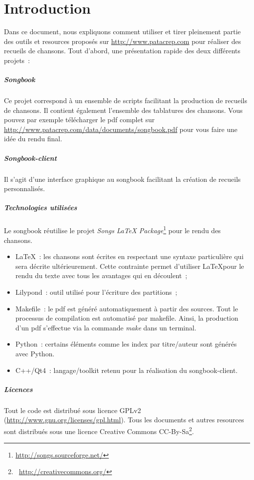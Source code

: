 \chapter*{Introduction}
\minitoc
\label{chap:introduction}

Dans ce document, nous expliquons comment utiliser et tirer pleinement
partie des outils et resources proposés sur \url{http://www.patacrep.com} pour
réaliser des recueils de chansons. Tout d'abord, une présentation
rapide des deux différents projets~:

\paragraph{Songbook}
Ce projet correspond à un ensemble de scripts facilitant la production
de recueils de chansons. Il contient également l'ensemble des
tablatures des chansons. Vous pouvez par exemple télécharger le pdf
complet sur \url{http://www.patacrep.com/data/documents/songbook.pdf}
pour vous faire une idée du rendu final.

\paragraph{Songbook-client} 
Il s'agit d'une interface graphique au songbook facilitant la création
de recueils personnalisés.

\paragraph{Technologies utilisées} 
Le songbook réutilise le projet \emph{Songs LaTeX
  Package}\footnote{\url{http://songs.sourceforge.net/}} pour le rendu
des chansons.

\begin{itemize}
\item \LaTeX~: les chansons sont écrites en respectant une syntaxe
  particulière qui sera décrite ultérieurement. Cette contrainte
  permet d'utiliser \LaTeX pour le rendu du texte avec tous les
  avantages qui en découlent~;
\item Lilypond~: outil utilisé pour l'écriture des partitions~;
\item Makefile~: le pdf est généré automatiquement à partir des sources. Tout le processus
  de compilation est automatisé par makefile. Ainsi, la production d'un pdf s'effectue
  via la commande \emph{make} dans un terminal.
\item Python~: certains éléments comme les index par titre/auteur
  sont générés avec Python.
\item C++/Qt4~: langage/toolkit retenu pour la réalisation du songbook-client.
\end{itemize}

\paragraph{Licences}
Tout le code est distribué sous licence GPLv2
(\url{http://www.gnu.org/licenses/gpl.html}). Tous les documents et
autres resources sont distribués sous une licence Creative Commons
CC-By-Sa\footnote{\bysa~\url{http://creativecommons.org/}}.

